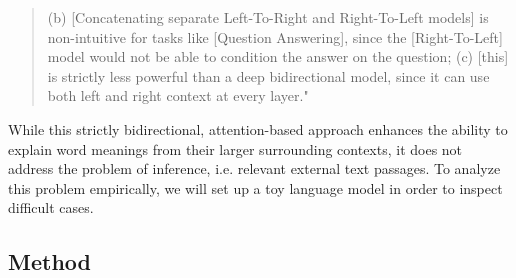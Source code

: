 \documentclass[jou]{apa6} %
\begin{document}
\blockquote[{\cite[p.~8]{devlinBertPretrainingDeep2018}}]{(b) [Concatenating separate Left-To-Right and Right-To-Left models] is non-intuitive for tasks like [Question Answering], since the [Right-To-Left] model would not be able to condition the answer on the question; (c) [this] is strictly less powerful than a deep bidirectional model, since it can use both left and right context at every layer."}
While this strictly bidirectional, attention-based approach enhances the ability to explain word meanings from their larger surrounding contexts, it does not address the problem of inference, i.e. relevant external text passages. To analyze this problem empirically, we will set up a toy language model in order to inspect difficult cases. 

\subsection{Method}
\end{document}
